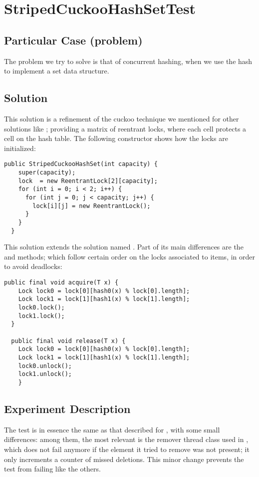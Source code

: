 \section{\textbf{StripedCuckooHashSetTest}}

\subsection{Particular Case (problem)}
The problem we try to solve is that of concurrent hashing, when we use
the hash to implement a set data structure.

\subsection{Solution}
This solution is a refinement of the cuckoo technique we mentioned for
other solutions like ; providing a matrix
of reentrant locks, where each cell protects a cell on the hash
table. The following constructor shows how the locks are initialized: \\

\begin{lstlisting}[style=numbers]
  public StripedCuckooHashSet(int capacity) {
    super(capacity);
    lock  = new ReentrantLock[2][capacity];
    for (int i = 0; i < 2; i++) {
      for (int j = 0; j < capacity; j++) {
        lock[i][j] = new ReentrantLock();
      }
    }
  }
\end{lstlisting}
\hfill

This solution extends the solution named . Part
of its main differences are the  and  methods;
which follow certain order on the locks associated to items, in
order to avoid deadlocks: \\

\begin{lstlisting}[style=numbers]
  public final void acquire(T x) {
    Lock lock0 = lock[0][hash0(x) % lock[0].length];
    Lock lock1 = lock[1][hash1(x) % lock[1].length];
    lock0.lock();
    lock1.lock();
  }

  public final void release(T x) {
    Lock lock0 = lock[0][hash0(x) % lock[0].length];
    Lock lock1 = lock[1][hash1(x) % lock[1].length];
    lock0.unlock();
    lock1.unlock();
    }
\end{lstlisting}
\hfill
    
\subsection{Experiment Description}
The test is in essence the same as that described for
, with some small differences: among them,
the most relevant is the
remover thread class used in , which does not fail
anymore if the element it tried to remove was not present; it only
increments a counter of missed deletions. This minor change prevents
the test from failing like the others.

